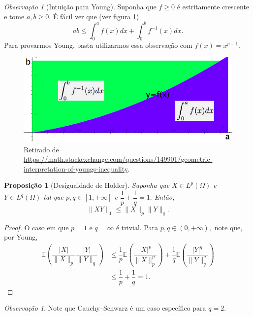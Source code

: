 \documentclass[12pt,a4paper,oneside]{book}
\newtheorem{proposition}[theorem]{Proposi\c{c}\~ao}
\theoremstyle{definition}
\theoremstyle{remark}
\newtheorem{remark}[theorem]{Observa\c{c}\~ao}
\numberwithin{equation}{section}
\newcommand{\E}{\mathbb{E}}
\begin{document}
\begin{tcolorbox}[colback = yellow!60]
\begin{remark}[Intuição para Young] Suponha que $f\geq 0$ é estritamente crescente e tome  $a,b\geq 0$. É fácil ver que (ver figura \ref{young-intuicao})
$$ab \leq \int_0^a f(x)dx +\int_0^b f^{-1}(x)dx. $$
Para provarmos Young, basta utilizarmos essa observação com $f(x) = x^{p-1}.$
\end{remark}



\end{tcolorbox}

\begin{figure}[h]\label{young-intuicao}
\centering %
\includegraphics[width=12cm]{intuicao-young} %
\caption{Retirado de \url{https://math.stackexchange.com/questions/149901/geometric-interpretation-of-youngs-inequality}.}
\end{figure}
 

\begin{proposition}[Desigualdade de Holder]
Suponha que $X\in L^p(\Omega)$ e $Y\in L^q(\Omega)$ tal que $p,q\in [1,+\infty]$ e 
$\dfrac{1}{p} +\dfrac{1}{q} = 1.$
Então, 
$$ \|XY\|_1\leq \|X \|_p\|Y\|_q .$$
\end{proposition}

\begin{proof}
O caso em que $p=1$ e $q=\infty$ é trivial. Para $p,q\in(0,+\infty),$ note que, por Young,
\begin{align*}
\E\left(\dfrac{|X|}{\|X\|_p}\dfrac{|Y|}{\|Y\|_q}\right) &\leq  \dfrac{1}{p}\E\left(\dfrac{|X|^p}{\|X\|^p_p}\right)+\dfrac{1}{q}\E\left(\dfrac{|Y|^q}{\|Y\|^q_q}\right)\\
&\leq  \dfrac{1}{p} + \dfrac{1}{q} = 1.
\end{align*}
\end{proof}

\begin{remark}
Note que Cauchy–Schwarz é um caso específico para $q=2.$
\end{remark}
\end{document}
